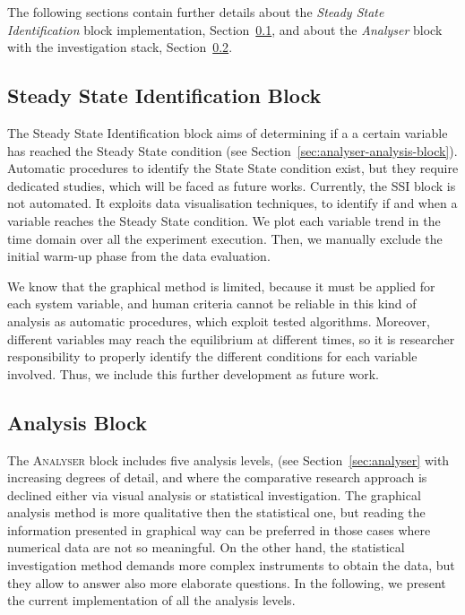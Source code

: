 The following sections contain further details about the \textit{Steady State Identification} block implementation, Section~\ref{sec:analyser-impl-ss-block}, and about the \textit{Analyser} block with the investigation stack, Section~\ref{sec:analyser-impl-analysis-block}.

\subsection{Steady State Identification Block}\label{sec:analyser-impl-ss-block}

The Steady State Identification block aims of determining if a a certain variable has reached the Steady State condition (see Section~\ref{sec:analyser-analysis-block}). Automatic procedures to identify the State State condition exist, but they require dedicated studies, which will be faced as future works. Currently, the SSI block is not automated. It exploits data visualisation techniques, to identify if and when a variable reaches the Steady State condition. We plot each variable trend in the time domain over all the experiment execution. Then, we manually exclude the initial warm-up phase from the data evaluation.

We know that the graphical method is limited, because it must be applied for each system variable, and human criteria cannot be reliable in this kind of analysis as automatic procedures, which exploit tested algorithms. Moreover, different variables may reach the equilibrium at different times, so it is researcher responsibility to properly identify the different conditions for each variable involved. Thus, we include this further development as future work.

\subsection{Analysis Block}\label{sec:analyser-impl-analysis-block}

\noindent The \textsc{Analyser} block includes five analysis levels, (see Section~\ref{sec:analyser} with increasing degrees of detail, and where the comparative research approach is declined either via visual analysis or statistical investigation. The graphical analysis method is more qualitative then the statistical one, but reading the information presented in graphical way can be preferred in those cases where numerical data are not so meaningful. On the other hand, the statistical investigation method demands more complex instruments to obtain the data, but they allow to answer also more elaborate questions. In the following, we present the current implementation of all the analysis levels.

